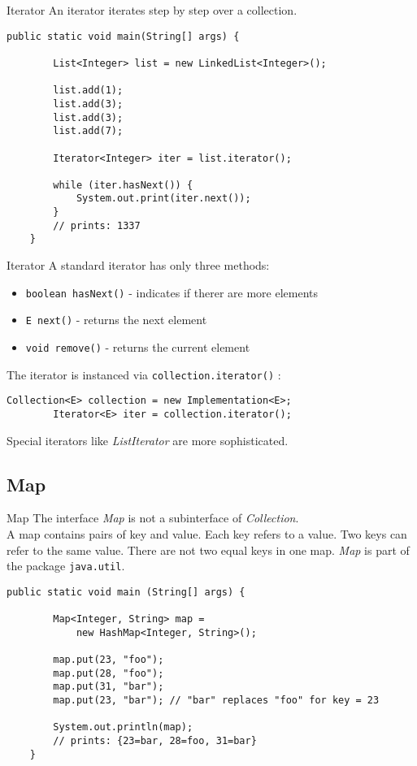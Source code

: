 \begin{frame}[fragile]{Iterator}
	An iterator iterates step by step over a collection.
	\begin{lstlisting}[basicstyle=\ttfamily\scriptsize]
	public static void main(String[] args) {
	
	    List<Integer> list = new LinkedList<Integer>();
	    
	    list.add(1);
	    list.add(3);
	    list.add(3);
	    list.add(7);
	    
	    Iterator<Integer> iter = list.iterator();
	    
	    while (iter.hasNext()) {
	        System.out.print(iter.next());
	    }
	    // prints: 1337
	}
	\end{lstlisting}
\end{frame}

\begin{frame}[fragile]{Iterator}
	A standard iterator has only three methods:
	\begin{itemize}
	\item \texttt{boolean hasNext()} - indicates if therer are more elements
	\item \texttt{E next()} - returns the next element
	\item \texttt{void remove()} - returns the current element
	\end{itemize}
	\vspace{1em}
	The iterator is instanced via \texttt{collection.iterator()} :
	\begin{lstlisting}[basicstyle=\ttfamily\scriptsize]
	    Collection<E> collection = new Implementation<E>;
	    Iterator<E> iter = collection.iterator();
	\end{lstlisting}
	Special iterators like \emph{ListIterator} are more sophisticated.
\end{frame}

\subsection{Map}
\begin{frame}[fragile]{Map}
	The interface \emph{Map} is not a subinterface of \emph{Collection}.\\
	A map contains pairs of key and value. Each key refers to a value. 
	Two keys can refer to the same value. There are not two equal keys in one map.
	\emph{Map} is part of the package \texttt{java.util}.
	\vfill
	\begin{lstlisting}[basicstyle=\ttfamily\scriptsize]
	public static void main (String[] args) {
	
	    Map<Integer, String> map = 
	        new HashMap<Integer, String>();
	    
	    map.put(23, "foo");
	    map.put(28, "foo");
	    map.put(31, "bar");
	    map.put(23, "bar"); // "bar" replaces "foo" for key = 23
	    
	    System.out.println(map);
	    // prints: {23=bar, 28=foo, 31=bar}
	}
	\end{lstlisting}
\end{frame}


